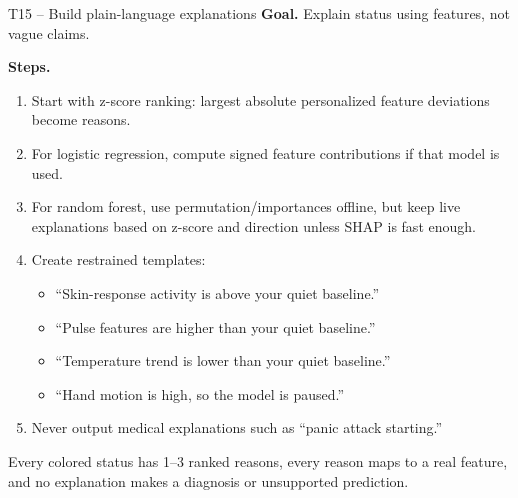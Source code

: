\documentclass[11pt,a4paper]{article}
\begin{document}
\begin{taskbox}{T15 -- Build plain-language explanations}
\textbf{Goal.} Explain status using features, not vague claims.

\textbf{Steps.}
\begin{enumerate}
\item Start with z-score ranking: largest absolute personalized feature deviations become reasons.
\item For logistic regression, compute signed feature contributions if that model is used.
\item For random forest, use permutation/importances offline, but keep live explanations based on z-score and direction unless SHAP is fast enough.
\item Create restrained templates:
\begin{itemize}
\item ``Skin-response activity is above your quiet baseline.''
\item ``Pulse features are higher than your quiet baseline.''
\item ``Temperature trend is lower than your quiet baseline.''
\item ``Hand motion is high, so the model is paused.''
\end{itemize}
\item Never output medical explanations such as ``panic attack starting.''
\end{enumerate}

\begin{donebox}
Every colored status has 1--3 ranked reasons, every reason maps to a real feature, and no explanation
makes a diagnosis or unsupported prediction.
\end{donebox}
\end{taskbox}
\end{document}
